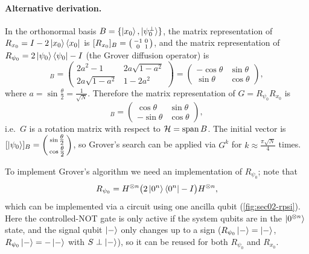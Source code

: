 \paragraph{Alternative derivation.}
In the orthonormal basis $B = \{\ket{x_0}, \ket{\psi_0^\perp}\}$, the matrix
representation of $R_{x_0} = I - 2\ket{x_0}\bra{x_0}$ is
$[R_{x_0}]_B = \begin{psmallmatrix} -1 & 0 \\ 0 & 1 \end{psmallmatrix}$, and the
matrix representation of $R_{\psi_0} = 2\ket{\psi_0}\bra{\psi_0} - I$ (the Grover
diffusion operator) is
\begin{equation}
  [R_{\psi_0}]_B = \begin{pmatrix} 2a^2 - 1 & 2a\sqrt{1-a^2} \\ 2a\sqrt{1-a^2} & 1 - 2a^2 \end{pmatrix}
  = \begin{pmatrix} -\cos\theta & \sin\theta \\ \sin\theta & \cos\theta \end{pmatrix},
\end{equation}
where $a = \sin\tfrac{\theta}{2} = \tfrac{1}{\sqrt{N}}$. Therefore the matrix
representation of $G = R_{\psi_0} R_{x_0}$ is
\begin{equation}
  [G]_B = \begin{pmatrix} \cos\theta & \sin\theta \\ -\sin\theta & \cos\theta \end{pmatrix},
\end{equation}
i.e.\ $G$ is a rotation matrix with respect to $\mathcal{H} = \operatorname{span} B$.
The initial vector is
$[\ket{\psi_0}]_B = \begin{psmallmatrix} \sin\tfrac{\theta}{2} \\ \cos\tfrac{\theta}{2} \end{psmallmatrix}$,
so Grover's search can be applied via $G^k$ for $k \approx \tfrac{\pi\sqrt{N}}{4}$
times.

To implement Grover's algorithm we need an implementation of $R_{\psi_0}$; note
that
\begin{equation}
  R_{\psi_0} = H^{\otimes n}\bigl(2\ket{0^n}\bra{0^n} - I\bigr) H^{\otimes n},
\end{equation}
which can be implemented via a circuit using one ancilla qubit
(\cref{fig:sec02-rpsi}). Here the controlled-NOT gate is only active if the
system qubits are in the $\ket{0^{\otimes n}}$ state, and the signal qubit
$\ket{-}$ only changes up to a sign ($R_{\psi_0}\ket{-} = \ket{-}$,
$R_{\psi_0}\ket{-} = -\ket{-}$ with $S \perp \ket{-}$), so it can be reused for
both $R_{\psi_0}$ and $R_{x_0}$.

